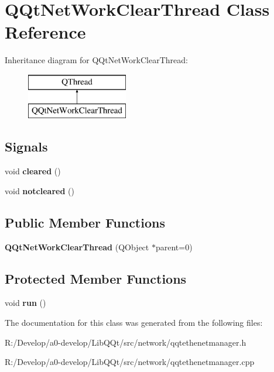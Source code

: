 \hypertarget{class_q_qt_net_work_clear_thread}{}\section{Q\+Qt\+Net\+Work\+Clear\+Thread Class Reference}
\label{class_q_qt_net_work_clear_thread}
Inheritance diagram for Q\+Qt\+Net\+Work\+Clear\+Thread\+:\begin{figure}[H]
\begin{center}
\leavevmode
\includegraphics[height=2.000000cm]{class_q_qt_net_work_clear_thread}
\end{center}
\end{figure}
\subsection*{Signals}
\begin{DoxyCompactItemize}
\item 
\mbox{\label{class_q_qt_net_work_clear_thread_aa21f381efcc89baf780cc7999685aa02}} 
void {\bfseries cleared} ()
\item 
\mbox{\label{class_q_qt_net_work_clear_thread_a4a6b589e4e98b2774a7f9a9a0dceaedc}} 
void {\bfseries notcleared} ()
\end{DoxyCompactItemize}
\subsection*{Public Member Functions}
\begin{DoxyCompactItemize}
\item 
\mbox{\label{class_q_qt_net_work_clear_thread_a63ec62489ea6d3c7ad306f570a102aa4}} 
{\bfseries Q\+Qt\+Net\+Work\+Clear\+Thread} (Q\+Object $\ast$parent=0)
\end{DoxyCompactItemize}
\subsection*{Protected Member Functions}
\begin{DoxyCompactItemize}
\item 
\mbox{\label{class_q_qt_net_work_clear_thread_aa1779d2ff52f074ca74b2aa242e512d4}} 
void {\bfseries run} ()
\end{DoxyCompactItemize}


The documentation for this class was generated from the following files\+:\begin{DoxyCompactItemize}
\item 
R\+:/\+Develop/a0-\/develop/\+Lib\+Q\+Qt/src/network/qqtethenetmanager.\+h\item 
R\+:/\+Develop/a0-\/develop/\+Lib\+Q\+Qt/src/network/qqtethenetmanager.\+cpp\end{DoxyCompactItemize}
